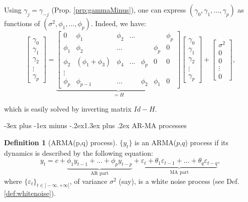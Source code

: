 \documentclass[
  11pt,
]{book}
\makeatletter
\renewcommand\section{\@startsection{section}{1}{\z@}
  {-3ex plus -1ex minus -.2ex}{1.3ex plus .2ex}
  {\normalfont\Large\bfseries\color{TextbookInk}}}
\theoremstyle{definition}
\newtheorem{definition}{Definition}[chapter]
\theoremstyle{definition}
\theoremstyle{definition}
\theoremstyle{definition}
\theoremstyle{remark}
\makeatother
\begin{document}
Using \(\gamma_j = \gamma_{-j}\) (Prop. \ref{prp:gammaMinus}), one can express \((\gamma_0,\gamma_1,\dots,\gamma_{p})\) as functions of \((\sigma^2,\phi_1,\dots,\phi_p)\). Indeed, we have:
\[
\left[\begin{array}{c}
\gamma_0 \\
\gamma_1 \\
\gamma_2 \\
\vdots\\
\gamma_p
\end{array}\right] =
\underbrace{\left[\begin{array}{cccccccc}
0 & \phi_1 & \phi_2 & \dots &&& \phi_p \\
\phi_1 & \phi_2 & \dots &&& \phi_p & 0 \\
\phi_2 & (\phi_1 + \phi_3) & \phi_4 & \dots & \phi_p& 0& 0 \\
\vdots\\
\phi_p & \phi_{p-1} & \dots &&\phi_2& \phi_1 & 0
\end{array}\right]}_{=H}\left[\begin{array}{c}
\gamma_0 \\
\gamma_1 \\
\gamma_2 \\
\vdots\\
\gamma_p
\end{array}\right] +
\left[\begin{array}{c}
\sigma^2 \\
0 \\
0 \\
\vdots\\
0
\end{array}\right],
\]

which is easily solved by inverting matrix \(Id - H\).

\section{AR-MA processes}\label{ar-ma-processes}

\begin{definition}[ARMA(p,q) process]
\protect\hypertarget{def:ARMApq}{}\label{def:ARMApq}\(\{y_t\}\) is an ARMA(\(p\),\(q\)) process if its dynamics is described by the following equation:
\begin{equation}
y_t = c + \underbrace{\phi_1 y_{t-1} + \dots + \phi_p y_{t-p}}_{\mbox{AR part}} + \underbrace{\varepsilon_t + \theta_1 \varepsilon_{t-1} + \dots + \theta_q \varepsilon_{t-q}}_{\mbox{MA part}},\label{eq:ARMApq}
\end{equation}
where \(\{\varepsilon_t\}_{t \in ] -\infty,+\infty[}\), of variance \(\sigma^2\) (say), is a white noise process (see Def. \ref{def:whitenoise}).
\end{definition}
\end{document}

